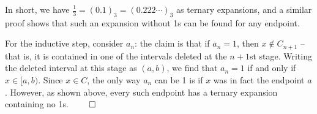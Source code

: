 \begin{solution}
\begin{enumerate}
    In short, we have $\frac 1 3 = (0.1)_3 = (0.222\cdots)_3$ as ternary expansions, and a similar proof shows that such an expansion without 1s can be found for any endpoint.

    For the inductive step, consider $a_n$: the claim is that if $a_n = 1$, then $x \not \in C_{n+1}$ -- that is, it is contained in one of the intervals deleted at the $n+1$st stage. Writing the deleted interval at this stage as $(a,b)$, we find that $a_n = 1$ if and only if $x \in [a, b)$. Since $x\in C$, the only way $a_n$ can be 1 is if $x$ was in fact the endpoint $a$. However, as shown above, every such endpoint has a ternary expansion containing no 1s. $\qed$
  \end{enumerate}
\end{solution}

